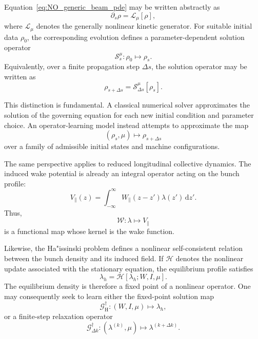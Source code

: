 \documentclass[11pt,a4paper]{article}
\providecommand{\dd}{\,\mathrm{d}}
\begin{document}
\begin{sloppypar}
Equation~\eqref{eq:NO_generic_beam_pde} may be written abstractly as
\begin{equation}
\partial_s\rho
=
\mathcal{L}_{\mu}[\rho],
\label{eq:NO_abstract_generator}
\end{equation}
where $\mathcal{L}_{\mu}$ denotes the generally nonlinear kinetic generator. For suitable initial data $\rho_0$, the corresponding evolution defines a parameter-dependent solution operator
\begin{equation}
\mathcal{S}^{\mu}_{s}
:
\rho_0
\longmapsto
\rho_s.
\label{eq:NO_solution_operator}
\end{equation}
Equivalently, over a finite propagation step $\Delta s$, the solution operator may be written as
\begin{equation}
\rho_{s+\Delta s}
=
\mathcal{S}^{\mu}_{\Delta s}[\rho_s].
\label{eq:NO_timestep_operator}
\end{equation}

This distinction is fundamental. A classical numerical solver approximates the solution of the governing equation for each new initial condition and parameter choice. An operator-learning model instead attempts to approximate the map
\begin{equation}
(\rho_s,\mu)
\longmapsto
\rho_{s+\Delta s}
\end{equation}
over a family of admissible initial states and machine configurations.

The same perspective applies to reduced longitudinal collective dynamics. The induced wake potential is already an integral operator acting on the bunch profile:
\begin{equation}
V_{\parallel}(z)
=
\int_{-\infty}^{\infty}
W_{\parallel}(z-z')
\lambda(z')
\dd z'.
\label{eq:NO_wake_conv}
\end{equation}
Thus,
\begin{equation}
\mathcal{W}
:
\lambda
\longmapsto
V_{\parallel}
\end{equation}
is a functional map whose kernel is the wake function.

Likewise, the Ha"issinski problem defines a nonlinear self-consistent relation between the bunch density and its induced field. If
$\mathcal{H}$ denotes the nonlinear update associated with the stationary equation, the equilibrium profile satisfies
\begin{equation}
\lambda_h
=
\mathcal{H}
\left[
\lambda_h;
W,
I,
\mu
\right].
\label{eq:NO_haissinski_fixedpoint}
\end{equation}
The equilibrium density is therefore a fixed point of a nonlinear operator. One may consequently seek to learn either the fixed-point solution map
\begin{equation}
\mathcal{G}^{\dagger}_{\mathrm{H}}
:
(W,I,\mu)
\longmapsto
\lambda_h,
\label{eq:NO_haissinski_operator}
\end{equation}
or a finite-step relaxation operator
\begin{equation}
\mathcal{G}^{\dagger}_{\Delta k}
:
(\lambda^{(k)},\mu)
\longmapsto
\lambda^{(k+\Delta k)}.
\label{eq:NO_relaxation_operator}
\end{equation}


\end{sloppypar}
\end{document}
